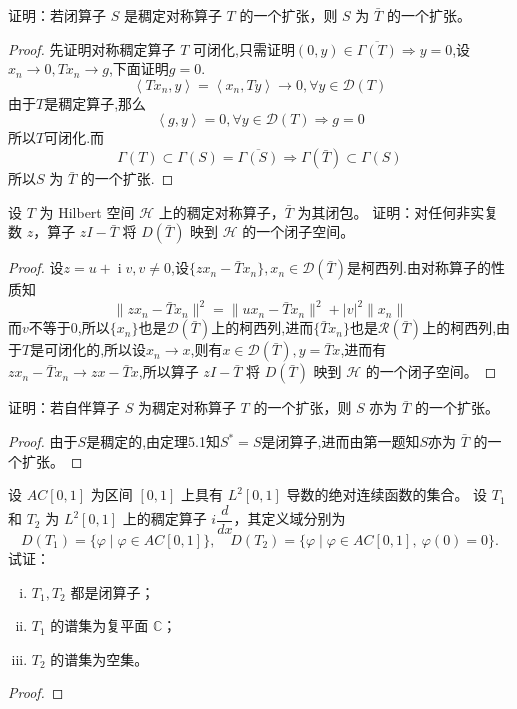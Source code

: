 \documentclass[lang=cn,newtx,10pt,scheme=chinese,thmcnt=chapter]{elegantbook}
\newcommand{\ci}{\operatorname{i}}
\begin{document}
\begin{problemset}

  \item 证明：若闭算子 \(S\) 是稠定对称算子 \(T\) 的一个扩张，则 \(S\) 为 \(\bar{T}\) 的一个扩张。
\begin{proof}
    先证明对称稠定算子 \(T\) 可闭化,只需证明$(0,y)\in \overline{\Gamma(T)}\Rightarrow y=0$,设$x_n\to 0,Tx_n\to  g$,下面证明$g=0$.
    \[\left\langle Tx_n,y\right\rangle=\left\langle x_n,Ty\right\rangle\to 0,\forall y\in \mathcal{D}(T)\]
    由于$T$是稠定算子,那么\[\left\langle g,y\right\rangle=0,\forall y\in\mathcal{D}(T)\Rightarrow g=0\]
    所以$T$可闭化.而\[\Gamma(T)\subset \Gamma(S)=\overline{\Gamma(S)}\Rightarrow \Gamma(\bar{T})\subset \Gamma(S)\]
    所以\(S\) 为 \(\bar{T}\) 的一个扩张.
\end{proof}
  \item 设 \(T\) 为 Hilbert 空间 \(\mathcal{H}\) 上的稠定对称算子，\(\bar{T}\) 为其闭包。  
  证明：对任何非实复数 \(z\)，算子 \({zI} - \bar{T}\) 将 \(D(\bar{T})\) 映到 \(\mathcal{H}\) 的一个闭子空间。
\begin{proof}
    设$z=u+\ci v,v\neq 0$,设$\{zx_n-\bar{T}x_n\},x_n\in \mathcal{D}(\bar{T})$是柯西列.由对称算子的性质知\[\|zx_n-\bar{T}x_n\|^2=\|ux_n-\bar{T}x_n\|^2+|v|^2\|x_n\|\]
    而$v$不等于$0$,所以$\{x_n\}$也是$\mathcal{D}(\bar{T})$上的柯西列,进而$\{\bar{T}x_n\}$也是$\mathcal{R}(\bar{T})$上的柯西列,由于$T$是可闭化的,所以设$x_n\to x$,则有$x\in \mathcal{D}(\bar{T}),y=\bar{T}x$,进而有$zx_n-\bar{T}x_n\to zx-\bar{T}x$,所以算子 \({zI} - \bar{T}\) 将 \(D(\bar{T})\) 映到 \(\mathcal{H}\) 的一个闭子空间。
\end{proof}
  \item 证明：若自伴算子 \(S\) 为稠定对称算子 \(T\) 的一个扩张，则 \(S\) 亦为 \(\bar{T}\) 的一个扩张。
  \begin{proof}
      由于$S$是稠定的,由定理5.1知$S^*=S$是闭算子,进而由第一题知$S$亦为 \(\bar{T}\) 的一个扩张。
      \end{proof}
  \item 设 \({AC}\left[0,1\right]\) 为区间 \(\left[0,1\right]\) 上具有 \({L}^{2}\left[0,1\right]\) 导数的绝对连续函数的集合。  
  设 \({T}_{1}\) 和 \({T}_{2}\) 为 \({L}^{2}\left[0,1\right]\) 上的稠定算子 \(i\dfrac{d}{dx}\)，其定义域分别为
  \[
  D({T}_{1}) = \{ \varphi \mid \varphi \in {AC}[0,1] \},
  \quad
  D({T}_{2}) = \{ \varphi \mid \varphi \in {AC}[0,1],\ \varphi(0) = 0 \}.
  \]
  试证：
  \begin{enumerate}[(i)]
    \item \({T}_{1},{T}_{2}\) 都是闭算子；
    \item \({T}_{1}\) 的谱集为复平面 \(\mathbb{C}\)；
    \item \({T}_{2}\) 的谱集为空集。
  \end{enumerate}
\begin{proof}
    

\end{proof}
\end{problemset}
\end{document}
